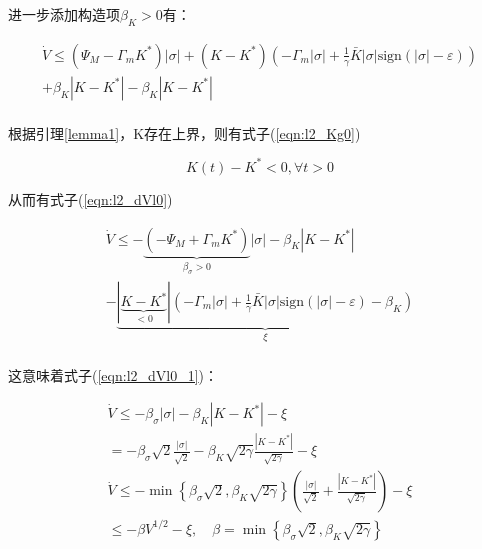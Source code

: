 进一步添加构造项$\beta_{K}>0$有：

$$\begin{array}{c}
	\dot{V}\leq \left( \varPsi _M-\varGamma _mK^* \right) \left| \sigma \right|+\left( K-K^* \right) \left( -\varGamma _m\left| \sigma \right|+\frac{1}{\gamma}\bar{K}\left| \sigma \right|\mathrm{sign}\left( \left| \sigma \right|-\varepsilon \right) \right)\\
	+\beta _K\left| K-K^* \right|-\beta _K\left| K-K^* \right|\\
\end{array}$$

根据引理\ref{lemma1}，K存在上界，则有式子(\ref{eqn:l2_Kg0})

\begin{equation}
    K\left( t \right) -K^*<0,\forall t>0
    \label{eqn:l2_Kg0}
\end{equation}

从而有式子(\ref{eqn:l2_dVl0})

\begin{equation}
    \begin{array}{c}
        \dot{V}\leq -\underset{\beta _{\sigma}>0}{\underbrace{\left( -\varPsi _M+\varGamma _mK^* \right) }}\left| \sigma \right|-\beta _K\left| K-K^* \right|\\
        -\underset{\xi}{\underbrace{\left| \underset{<0}{\underbrace{K-K^*}} \right|\left( -\varGamma _m\left| \sigma \right|+\frac{1}{\gamma}\bar{K}\left| \sigma \right|\mathrm{sign}\left( \left| \sigma \right|-\varepsilon \right) -\beta _K \right) }}\\
    \end{array}
    \label{eqn:l2_dVl0}
\end{equation}

这意味着式子(\ref{eqn:l2_dVl0_1})：

\begin{equation}
    \begin{array}{c}
        \dot{V}\leq -\beta _{\sigma}\left| \sigma \right|-\beta _K\left| K-K^* \right|-\xi\\
        =-\beta _{\sigma}\sqrt{2}\frac{\left| \sigma \right|}{\sqrt{2}}-\beta _K\sqrt{2\gamma}\frac{\left| K-K^* \right|}{\sqrt{2\gamma}}-\xi\\
        \dot{V} \le -\min \left\{ \beta _{\sigma}\sqrt{2}, \beta _K\sqrt{2\gamma} \right\} \left( \frac{\left| \sigma \right|}{\sqrt{2}}+\frac{\left| K-K^* \right|}{\sqrt{2\gamma}} \right) -\xi\\
        \le -\beta V^{1/2}-\xi, \quad \beta =\min \left\{ \beta _{\sigma}\sqrt{2}, \beta _K\sqrt{2\gamma} \right\}\\
    \end{array}
    \label{eqn:l2_dVl0_1}
\end{equation}

